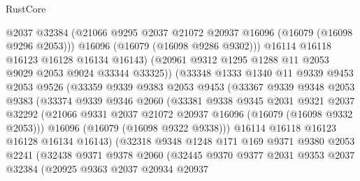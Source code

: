 \begin{lexlean}{RustCore}
\begin{coremodule}
                        @2037
                        @32384
                        (@21066 @9295 @2037 @21072 @20937 @16096 (@16079 (@16098 @9296 @2053)))
                        @16096
                        (@16079 (@16098 @9286 @9302)))
                      @16114
                      @16118
                      @16123
                      @16128
                      @16134
                      @16143)
                    (@20961 @9312 @1295 @1288 @11 @2053 @9029 @2053 @9024 @33344 @33325))
                  (@33348
                    @1333
                    @1340
                    @11
                    @9339
                    @9453
                    @2053
                    @9526
                    (@33359
                      @9339
                      @9383
                      @2053
                      @9453
                      (@33367
                        @9339
                        @9348
                        @2053
                        @9383
                        (@33374
                          @9339
                          @9346
                          @2060
                          (@33381
                            @9338
                            @9345
                            @2031
                            @9321
                            @2037
                            @32292
                            (@21066 @9331 @2037 @21072 @20937 @16096 (@16079 (@16098 @9332 @2053)))
                            @16096
                            (@16079 (@16098 @9322 @9338)))
                          @16114
                          @16118
                          @16123
                          @16128
                          @16134
                          @16143)
                        (@32318
                          @9348
                          @1248
                          @171
                          @169
                          @9371
                          @9380
                          @2053
                          @2241
                          (@32438
                            @9371
                            @9378
                            @2060
                            (@32445
                              @9370
                              @9377
                              @2031
                              @9353
                              @2037
                              @32384
                              (@20925
                                @9363
                                @2037
                                @20934
                                @20937

\end{coremodule}
\end{lexlean}
